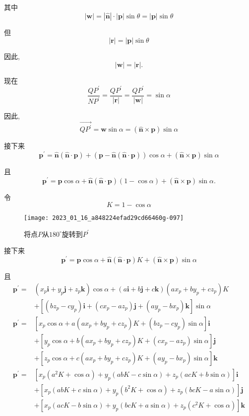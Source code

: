 其中
$$
|\mathbf{w}|=|\hat{\mathbf{n}}| \cdot|\mathbf{p}| \sin \theta=|\mathbf{p}| \sin \theta
$$

但
$$
|\mathbf{r}|=|\mathbf{p}| \sin \theta
$$

因此,
$$
|\mathbf{w}|=|\mathbf{r}| .
$$

现在
$$
\frac{Q P^{\prime}}{N P^{\prime}}=\frac{Q P^{\prime}}{|\mathbf{r}|}=\frac{Q P^{\prime}}{|\mathbf{w}|}=\sin \alpha
$$

因此,
$$
\overrightarrow{Q P^{\prime}}=\mathbf{w} \sin \alpha=(\hat{\mathbf{n}} \times \mathbf{p}) \sin \alpha
$$

接下来
$$
\mathbf{p}^{\prime}=\hat{\mathbf{n}}(\hat{\mathbf{n}} \cdot \mathbf{p})+(\mathbf{p}-\hat{\mathbf{n}}(\hat{\mathbf{n}} \cdot \mathbf{p})) \cos \alpha+(\hat{\mathbf{n}} \times \mathbf{p}) \sin \alpha
$$

且
$$
\mathbf{p}^{\prime}=\mathbf{p} \cos \alpha+\hat{\mathbf{n}}(\hat{\mathbf{n}} \cdot \mathbf{p})(1-\cos \alpha)+(\hat{\mathbf{n}} \times \mathbf{p}) \sin \alpha .
$$

令
$$
K=1-\cos \alpha
$$

\begin{figure}
    \centering
    \texttt{[image: 2023\_01\_16\_a848224efad29cd66460g-097]}
    \caption[short]{将点$P$从$180^{\circ}$旋转到$P^{\prime}$}
\end{figure}

接下来
$$
\mathbf{p}^{\prime}=\mathbf{p} \cos \alpha+\hat{\mathbf{n}}(\hat{\mathbf{n}} \cdot \mathbf{p}) K+(\hat{\mathbf{n}} \times \mathbf{p}) \sin \alpha
$$

且
$$
\begin{aligned}
\mathbf{p}^{\prime}= & \left(x_{p} \mathbf{i}+y_{p} \mathbf{j}+z_{p} \mathbf{k}\right) \cos \alpha+(a \mathbf{i}+b \mathbf{j}+c \mathbf{k})\left(a x_{p}+b y_{p}+c z_{p}\right) K \\
& +\left[\left(b z_{p}-c y_{p}\right) \mathbf{i}+\left(c x_{p}-a z_{p}\right) \mathbf{j}+\left(a y_{p}-b x_{p}\right) \mathbf{k}\right] \sin \alpha \\
\mathbf{p}^{\prime}= & {\left[x_{p} \cos \alpha+a\left(a x_{p}+b y_{p}+c z_{p}\right) K+\left(b z_{p}-c y_{p}\right) \sin \alpha\right] \mathbf{i} } \\
& +\left[y_{p} \cos \alpha+b\left(a x_{p}+b y_{p}+c z_{p}\right) K+\left(c x_{p}-a z_{p}\right) \sin \alpha\right] \mathbf{j} \\
& +\left[z_{p} \cos \alpha+c\left(a x_{p}+b y_{p}+c z_{p}\right) K+\left(a y_{p}-b x_{p}\right) \sin \alpha\right] \mathbf{k} \\
\mathbf{p}^{\prime}= & {\left[x_{p}\left(a^{2} K+\cos \alpha\right)+y_{p}(a b K-c \sin \alpha)+z_{p}(a c K+b \sin \alpha)\right] \mathbf{i} } \\
& +\left[x_{p}(a b K+c \sin \alpha)+y_{p}\left(b^{2} K+\cos \alpha\right)+z_{p}(b c K-a \sin \alpha)\right] \mathbf{j} \\
& +\left[x_{p}(a c K-b \sin \alpha)+y_{p}(b c K+a \sin \alpha)+z_{p}\left(c^{2} K+\cos \alpha\right)\right] \mathbf{k}
\end{aligned}
$$

